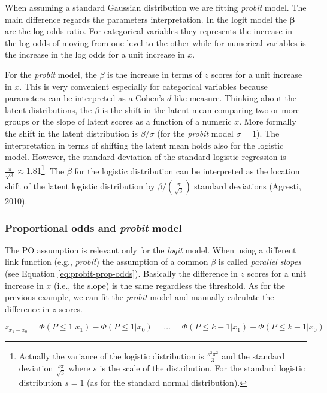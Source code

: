 \documentclass[
  man, mask,floatsintext]{apa6}
\begin{document}
When assuming a standard Gaussian distribution we are fitting \emph{probit} model. The main difference regards the parameters interpretation. In the logit model the \(\boldsymbol{\beta}\) are the log odds ratio. For categorical variables they represents the increase in the log odds of moving from one level to the other while for numerical variables is the increase in the log odds for a unit increase in \(x\).

For the \emph{probit} model, the \(\beta\) is the increase in terms of \(z\) scores for a unit increase in \(x\). This is very convenient especially for categorical variables because parameters can be interpreted as a Cohen's \(d\) like measure. Thinking about the latent distributions, the \(\beta\) is the shift in the latent mean comparing two or more groups or the slope of latent scores as a function of a numeric \(x\). More formally the shift in the latent distribution is \(\beta/\sigma\) (for the \emph{probit} model \(\sigma = 1\)). The interpretation in terms of shifting the latent mean holds also for the logistic model. However, the standard deviation of the standard logistic regression is \(\frac{\pi}{\sqrt{3}} \approx 1.81\)\footnote{Actually the variance of the logistic distribution is \(\frac{s^2\pi^2}{3}\) and the standard deviation \(\frac{s\pi}{\sqrt{3}}\) where \(s\) is the scale of the distribution. For the standard logistic distribution \(s = 1\) (as for the standard normal distribution).}. The \(\beta\) for the logistic distribution can be interpreted as the location shift of the latent logistic distribution by \(\beta/(\frac{\pi}{\sqrt{3}})\) standard deviations (Agresti, 2010).

\subsubsection{\texorpdfstring{Proportional odds and \emph{probit} model}{Proportional odds and probit model}}\label{proportional-odds-and-probit-model}

The PO assumption is relevant only for the \emph{logit} model. When using a different link function (e.g., \emph{probit}) the assumption of a common \(\beta\) is called \emph{parallel slopes} (see Equation \eqref{eq:probit-prop-odds}). Basically the difference in \(z\) scores for a unit increase in \(x\) (i.e., the slope) is the same regardless the threshold. As for the previous example, we can fit the \emph{probit} model and manually calculate the difference in \(z\) scores.

\begin{equation}
z_{x_1 - x_0} = \Phi(P \leq 1|x_1) - \Phi(P \leq 1|x_0) = \dots = \Phi(P \leq k - 1|x_1) - \Phi(P \leq k - 1|x_0)
\label{eq:probit-prop-odds}
\end{equation}
\end{document}
